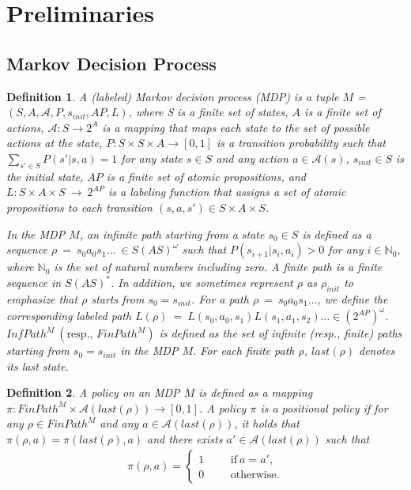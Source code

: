\documentclass[letterpaper, 10 pt, conference]{ieeeconf}  %
\newtheorem{definition}{Definition}
\begin{document}
\section{Preliminaries}

\subsection{Markov Decision Process}

\begin{definition}
A (labeled) Markov decision process (MDP) is a tuple $M$ = $(S, A, \mathcal{A}, P, s_{init}, AP, L)$, where S is a finite set of states, $A$ is a finite set of actions, $\mathcal{A} : S \rightarrow 2^A$ is a mapping that maps each state to the set of possible actions at the state, $P:S \times S \times A \rightarrow [0,1]$ is a transition probability such that $\sum_{s' \in S} P(s'|s,a) = 1$ for any state $s \in S$ and any action $a \in \mathcal{A}(s) $, $s_{init} \in S$ is the initial state, $AP$ is a finite set of atomic propositions, and $L : S \times A \times S\ \rightarrow\ 2^{AP}$ is a labeling function that assigns a set of atomic propositions to each transition $(s, a, s') \in S \times A \times S$.

In the MDP $M$, an infinite path starting from a state $s_0 \in S$ is defined as a sequence $\rho\ =\ s_0a_0s_1 \ldots\ \in S (A S)^{\omega}$ such that $P(s_{i+1}|s_i, a_i) > 0$ for any $ i \in \mathbb{N}_0$, where $\mathbb{N}_0$ is the set of natural numbers including zero.  A finite path is a finite sequence in $S (A S)^*$. In addition, we sometimes represent $\rho$ as $\rho_{init}$ to emphasize that $\rho$ starts from $s_0 = s_{init}$.
For a path $\rho\ =\ s_0a_0s_1 \ldots$, we define the corresponding labeled path $L(\rho)\ =\ L(s_0,a_0,s_1)L(s_1,a_1,s_2) \ldots \in (2^{AP})^{\omega}$. $InfPath^{M}\ ( \text{resp., }FinPath^{M})$ is defined as the set of infinite (resp., finite) paths starting from $s_0=s_{init}$ in the MDP $M$. For each finite path $\rho$, $last(\rho)$ denotes its last state.
\end{definition}

\begin{definition}
  A policy on an MDP $M$ is defined as a mapping $\pi:FinPath^{M} \times \mathcal{A}(last(\rho)) \rightarrow [0,1]$. A policy $\pi$ is a {\it positional} policy if for any $ \rho \in FinPath^{M}$ and any $ a \in \mathcal{A}(last(\rho))$, it holds that $\pi(\rho, a)=\pi(last(\rho),a)$ and there exists $ a' \in \mathcal{A}(last(\rho))$ such that
  \begin{align*}
    \pi(\rho, a) =
    \left\{
    \begin{aligned}
      1 &   & &\text{if}\ a=a',\\
      0 &   & &\text{otherwise}.
    \end{aligned}
    \right.
  \end{align*}
\end{definition}
\end{document}

